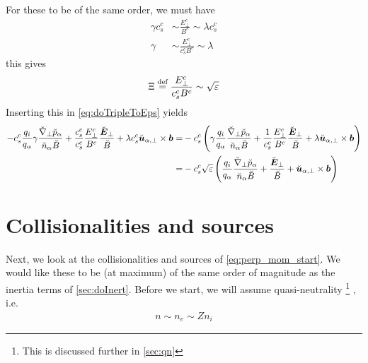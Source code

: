 %
For these to be of the same order, we must have
%
\begin{align*}
    \gamma c^c_s &\sim \frac{E_\perp^c}{B^c} \sim \lambda c^c_s \\
    \gamma     &\sim \frac{E_\perp^c}{c^c_sB^c} \sim \lambda
\end{align*}
%
this gives
%
\begin{align*}
    \Xi \overset{\text{def}}{=} \frac{E_\perp^c}{c^c_sB^c} \sim \sqrt{\varepsilon}
\end{align*}
%
Inserting this in \cref{eq:doTripleToEps} yields
%
\begin{align*}
-
c^c_s
\frac{q_i}{q_\a}
\gamma
\frac{ \breve{\grad}_\perp \breve{p}_\a }{\breve{n}_\a \breve{B}}
+ \frac{c^c_s}{c^c_s}\frac{E_\perp^c}{B^c}
\frac{\breve{\ve{E}}_\perp}{\breve{B}}
+\lambda c^c_s
\breve{\ve{u}}_{\a,\perp}\times\ve{b}
=&
-
c^c_s
\L(
\gamma
\frac{q_i}{q_\a}
\frac{ \breve{\grad}_\perp \breve{p}_\a }{\breve{n}_\a \breve{B}}
+ \frac{1}{c^c_s}\frac{E_\perp^c}{B^c}
\frac{\breve{\ve{E}}_\perp}{\breve{B}}
+\lambda
\breve{\ve{u}}_{\a,\perp}\times\ve{b}
\R)
\\
%
%
=&
-
c^c_s
\sqrt{\e}
\L(
\frac{q_i}{q_\a}
\frac{ \breve{\grad}_\perp \breve{p}_\a }{\breve{n}_\a \breve{B}}
+
\frac{\breve{\ve{E}}_\perp}{\breve{B}}
+
\breve{\ve{u}}_{\a,\perp}\times\ve{b}
\R)
\end{align*}

\section{Collisionalities and sources}
%
Next, we look at the collisionalities and sources of \cref{eq:perp_mom_start}.
We would like these to be (at maximum) of the same order of magnitude as the inertia terms of \cref{sec:doInert}.
Before we start, we will assume quasi-neutrality%
\footnote{This is discussed further in \cref{sec:qn}}%
%
, i.e.
%
\begin{align*}
    n\sim n_e \sim Zn_i
\end{align*}
%

